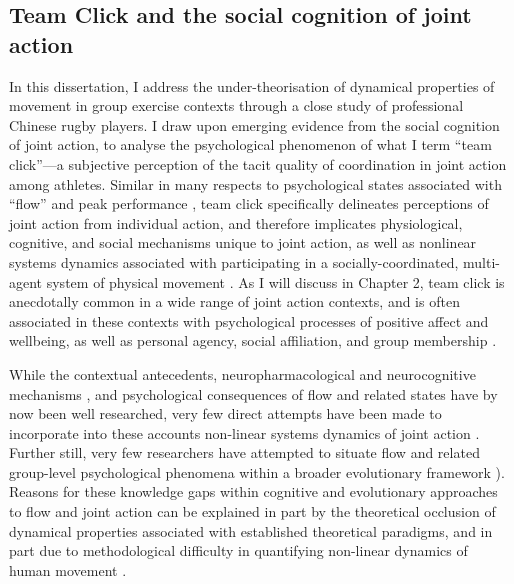 \subsection{Team Click and the social cognition of joint action}
In this dissertation, I address the under-theorisation of dynamical properties of movement in group exercise contexts through a close study of professional Chinese rugby players.  I draw upon emerging evidence from the social cognition of joint action, to analyse the psychological phenomenon of what I term ``team click''---a subjective perception of the tacit quality of coordination in joint action among athletes.  Similar in many respects to psychological states associated with ``flow'' and peak performance \citep{Csikszentmihalyi1992}, team click specifically delineates perceptions of joint action from individual action, and therefore implicates physiological, cognitive, and social mechanisms unique to joint action, as well as nonlinear systems dynamics associated with participating in a socially-coordinated, multi-agent system of physical movement \citep{Kelso2009}. As I will discuss in Chapter 2, team click is anecdotally common in a wide range of joint action contexts, and is often associated in these contexts with psychological processes of positive affect and wellbeing, as well as personal agency, social affiliation, and group membership \citep{Jackson1995,Wheatley2012,Slingerland2014}.

While the contextual antecedents\citep{Fong2015}, neuropharmacological \citep{Boecker2008} and neurocognitive mechanisms \citep{Dietrich2004,Dietrich2011,Cheron2016}, and psychological consequences \citep{Wheatley2012} of flow and related states have by now been well researched, very few direct attempts have been made to incorporate into these accounts non-linear systems dynamics of joint action \citep[but see][]{Oullier2008,Marsh2009}.  Further still, very few researchers have attempted to situate flow and related group-level psychological phenomena within a broader evolutionary framework \citep[but, for a general theoretical proposal, see][]{Slingerland2014}).  Reasons for these knowledge gaps within cognitive and evolutionary approaches to flow and joint action can be explained in part by the theoretical occlusion of dynamical properties associated with established theoretical paradigms, and in part due to methodological difficulty in quantifying non-linear dynamics of human movement \citep{Kelso2006,Kelso2009}.

